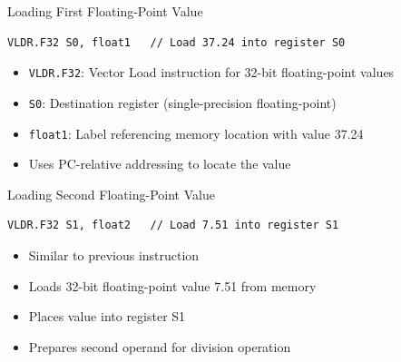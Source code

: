 \documentclass[aspectratio=169]{beamer}
\begin{document}



\begin{frame}[fragile]{Loading First Floating-Point Value}
\begin{verbatim}
VLDR.F32 S0, float1   // Load 37.24 into register S0
\end{verbatim}

\begin{itemize}
\item \texttt{VLDR.F32}: Vector Load instruction for 32-bit floating-point values
\item \texttt{S0}: Destination register (single-precision floating-point)
\item \texttt{float1}: Label referencing memory location with value 37.24
\item Uses PC-relative addressing to locate the value
\end{itemize}
\end{frame}

\begin{frame}[fragile]{Loading Second Floating-Point Value}
\begin{verbatim}
VLDR.F32 S1, float2   // Load 7.51 into register S1
\end{verbatim}

\begin{itemize}
\item Similar to previous instruction
\item Loads 32-bit floating-point value 7.51 from memory
\item Places value into register S1
\item Prepares second operand for division operation
\end{itemize}
\end{frame}
\end{document}
